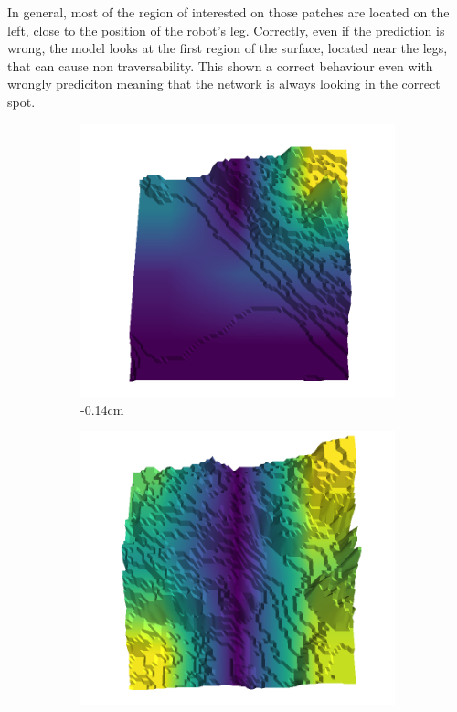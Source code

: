 In general, most of the region of interested on those patches are located on the left, close to the position of the robot's leg. Correctly, even if the prediction is wrong, the model looks at the first region of the surface, located near the legs, that can cause non traversability. This shown a correct behaviour even with wrongly prediciton meaning that the network is always looking in the correct spot. 
\begin{figure}[H]
\centering
\begin{subfigure}[b]{0.192\linewidth}
\includegraphics[width=\linewidth]{../img/5/quarry/false_negative/-14-patch-3d-majavi-colormap-0.png}
\caption{-0.14cm}
\label{fig : quarry-false_negative-0}
\end{subfigure}
\begin{subfigure}[b]{0.192\linewidth}
\includegraphics[width=\linewidth]{../img/5/quarry/false_negative/-6-patch-3d-majavi-colormap-10.png}

\end{subfigure}
\end{figure}
